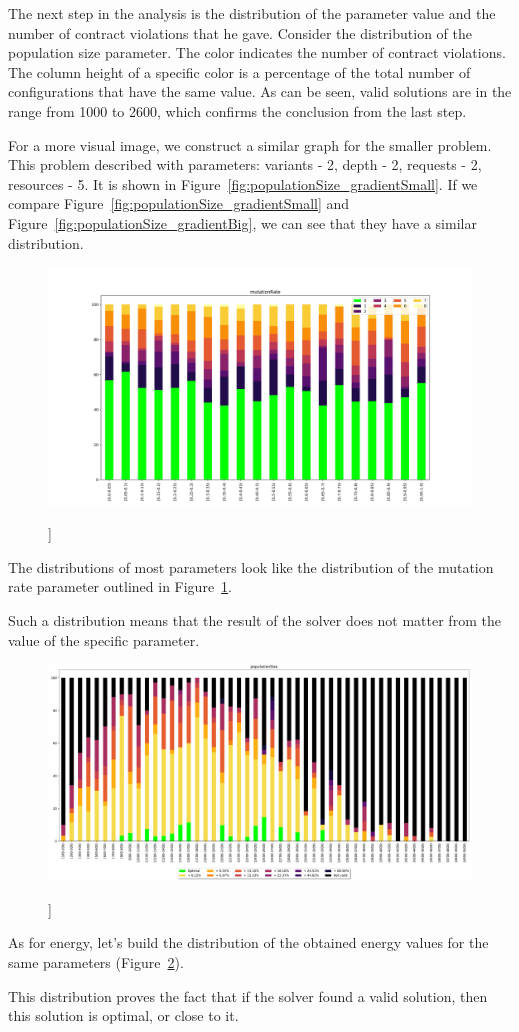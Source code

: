 The next step in the analysis is the distribution of the parameter value and the number of contract violations that he gave. Consider the distribution of the population size parameter.
The color indicates the number of contract violations. The column height of a specific color is a percentage of the total number of configurations that have the same value. As can be seen, valid solutions are in the range from 1000 to 2600, which confirms the conclusion from the last step.

For a more visual image, we construct a similar graph for the smaller problem. This problem described with parameters: variants - 2, depth - 2, requests - 2, resources - 5.
It is shown in Figure~\ref{fig:populationSize_gradientSmall}. If we compare Figure~\ref{fig:populationSize_gradientSmall} and Figure~\ref{fig:populationSize_gradientBig}, we can see that they have a similar distribution.

\begin{figure}
	\centering
	\includegraphics[width=\textwidth]{images/mutationRate_gradient_500dpi.png}
	\caption[]]{}
	\label{fig:mutationRate_gradient}
\end{figure}

The distributions of most parameters look like the distribution of the mutation rate parameter outlined in Figure~\ref{fig:mutationRate_gradient}.

Such a distribution means that the result of the solver does not matter from the value of the specific parameter.

\begin{figure}
	\centering
	\includegraphics[width=\textwidth]{images/populationSizeObjective.pdf}
	\caption[]]{}
	\label{fig:populationSizeObjective}
\end{figure}

As for energy, let's build the distribution of the obtained energy values for the same parameters (Figure~\ref{fig:populationSizeObjective}).

This distribution proves the fact that if the solver found a valid solution, then this solution is optimal, or close to it.